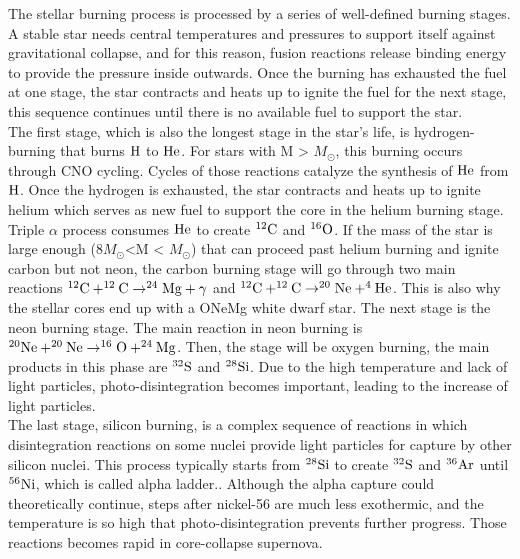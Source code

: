 \documentclass[aps,prl,preprint,groupedaddress]{revtex4}
\begin{document}
The stellar burning process is processed by a series of well-defined burning stages. A stable star needs central temperatures and pressures to support itself against gravitational collapse, and for this reason, fusion reactions release binding energy to provide the pressure inside outwards. Once the burning has exhausted the fuel at one stage, the star contracts and heats up to ignite the fuel for the next stage, this sequence continues until there is no available fuel to support the star.\\

The first stage, which is also the longest stage in the star's life, is hydrogen-burning that burns $\rm{H}$ to $\rm{He}$. For stars with M \textgreater {} $M_{\odot}$, this burning occurs through CNO cycling. Cycles of those reactions catalyze the synthesis of $\rm{He}$ from $\rm{H}$. Once the hydrogen is exhausted, the star contracts and heats up to ignite helium which serves as new fuel to support the core in the helium burning stage. Triple $\alpha$ process consumes $\rm{He}$ to create $\rm{ ^{12}C}$ and $\rm{ ^{16}O} $. If the mass of the star is large enough ($8M_{\odot}$\space \textless \space M \textless {} $M_{\odot}$) that can proceed past helium burning and ignite carbon but not neon, the carbon burning stage will go through two main reactions $\rm{^{12}C + ^{12}C \rightarrow ^{24}Mg + \gamma}$ and $\rm{\rm{^{12}C + ^{12}C \rightarrow ^{20}Ne + ^4He}}$. This is also why the stellar cores end up with a ONeMg white dwarf star. The next stage is the neon burning stage. The main reaction in neon burning is $\rm{^{20}{\rm Ne} + ^{20}{\rm Ne} \to  ^{16}{\rm O} + ^{24}{\rm Mg}}$. Then, the stage will be oxygen burning, the  main products in this phase are $\rm{^{32}S}$ and $\rm{^{28}Si}$. Due to the high temperature and lack of light particles, photo-disintegration becomes important, leading to the increase of light particles.\\

The last stage, silicon burning, is a complex sequence of reactions in which disintegration reactions on some nuclei provide light particles for capture by other silicon nuclei. This process typically starts from $\rm{^{28}Si}$ to create $\rm{^{32}S}$ and $\rm{^{36}Ar}$ until $\rm{^{56}Ni}$, which is called alpha ladder.\cite{Hansen2004}. Although the alpha capture could theoretically continue, steps after nickel-56 are much less exothermic, and the temperature is so high that photo-disintegration prevents further progress. Those reactions becomes rapid in core-collapse supernova\cite{1999ApJS..125..439I}.\\
\end{document}

